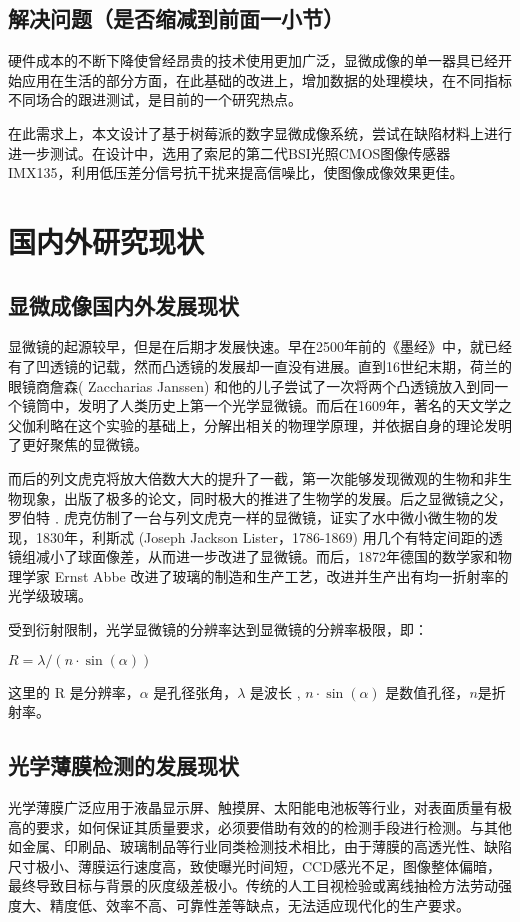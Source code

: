 \subsection{解决问题（是否缩减到前面一小节）}
硬件成本的不断下降使曾经昂贵的技术使用更加广泛，显微成像的单一器具已经开始应用在生活的部分方面，在此基础的改进上，增加数据的处理模块，在不同指标不同场合的跟进测试，是目前的一个研究热点。

在此需求上，本文设计了基于树莓派的数字显微成像系统，尝试在缺陷材料上进行进一步测试。在设计中，选用了索尼的第二代BSI光照CMOS图像传感器IMX135，利用低压差分信号抗干扰来提高信噪比，使图像成像效果更佳。


\section{国内外研究现状}
\subsection{显微成像国内外发展现状}
显微镜的起源较早，但是在后期才发展快速。早在2500年前的《墨经》中，就已经有了凹透镜的记载，然而凸透镜的发展却一直没有进展。直到16世纪末期，荷兰的眼镜商詹森( Zaccharias Janssen) 和他的儿子尝试了一次将两个凸透镜放入到同一个镜筒中，发明了人类历史上第一个光学显微镜。而后在1609年，著名的天文学之父伽利略在这个实验的基础上，分解出相关的物理学原理，并依据自身的理论发明了更好聚焦的显微镜。

而后的列文虎克将放大倍数大大的提升了一截，第一次能够发现微观的生物和非生物现象，出版了极多的论文，同时极大的推进了生物学的发展。后之显微镜之父，罗伯特﹒虎克仿制了一台与列文虎克一样的显微镜，证实了水中微小微生物的发现，1830年，利斯忒 (Joseph Jackson Lister，1786-1869) 用几个有特定间距的透镜组减小了球面像差，从而进一步改进了显微镜。而后，1872年德国的数学家和物理学家 Ernst Abbe 改进了玻璃的制造和生产工艺，改进并生产出有均一折射率的光学级玻璃。

受到衍射限制，光学显微镜的分辨率达到显微镜的分辨率极限，即：
\begin{center}
	$ R = \lambda/(n \cdot \sin(\alpha)) $ 
\end{center}
这里的 R 是分辨率，$\alpha$ 是孔径张角，$\lambda$ 是波长 , $n\cdot\sin(\alpha)$ 是数值孔径，$n$是折射率。 
	

\subsection{光学薄膜检测的发展现状}
 光学薄膜广泛应用于液晶显示屏、触摸屏、太阳能电池板等行业，对表面质量有极高的要求，如何保证其质量要求，必须要借助有效的的检测手段进行检测。与其他如金属、印刷品、玻璃制品等行业同类检测技术相比，由于薄膜的高透光性、缺陷尺寸极小、薄膜运行速度高，致使曝光时间短，CCD感光不足，图像整体偏暗，最终导致目标与背景的灰度级差极小。传统的人工目视检验或离线抽检方法劳动强度大、精度低、效率不高、可靠性差等缺点，无法适应现代化的生产要求。



